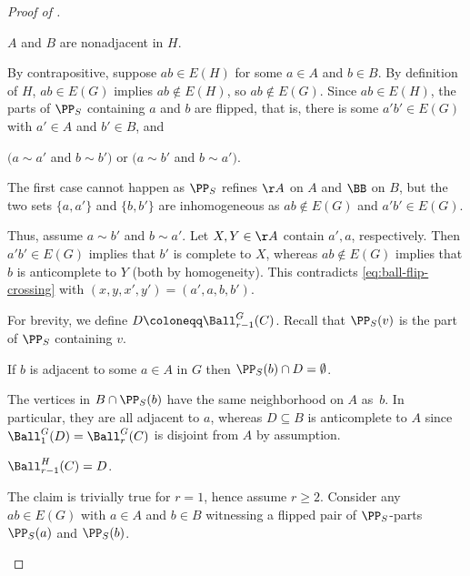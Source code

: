 \begin{proof}[Proof of ]
    \begin{claim}[\ref{itm:ball-flip-P1}]\label{clm:ball-flip-P1}
        $A$ and $B$ are nonadjacent in $H$.
    \end{claim}
    \begin{claimproof}
By contrapositive, suppose $ab\in E(H)$ for some $a \in A$ and $b \in B$.
    By definition of $H$,  $ab\in E(G)$ implies $ab\notin E(H)$, so
     $ab\notin E(G)$.
    Since $ab\in E(H)$, the parts of $\PP_S$ containing $a$ and $b$ are flipped, that is, there is some $a'b'\in E(G)$ with $a' \in A$ and $b' \in B$,
    and
    \begin{center}
        $(a\sim a'$ and $b\sim b')$
        \qquad
        or
        \qquad
        $(a\sim b'$ and $b\sim a')$.
    \end{center}
    The first case cannot happen
    as $\PP_S$ refines $\AA$ on $A$ and $\BB$ on $B$, but the two sets $\{a,a'\}$ and $\{b,b'\}$ are inhomogeneous as $ab\notin E(G)$ and $a'b'\in E(G)$.

    Thus, assume $a\sim b'$ and $b\sim a'$.
    Let $X,Y\in\AA$ contain $a',a$, respectively.
    Then $a'b'\in E(G)$ implies that $b'$ is complete to $X$, whereas  $ab\notin E(G)$ implies that $b$ is anticomplete to $Y$ (both by homogeneity). This contradicts \eqref{eq:ball-flip-crossing} with $(x,y,x',y')=(a',a,b,b')$.
\end{claimproof}

    For brevity, we define $D\coloneqq \Ball_{r-1}^G(C)$. Recall that $\PP_S(v)$ is the part of $\PP_S$ containing $v$.

    \begin{claim}\label{clm:disjoint-from-d}
        If $b$ is adjacent to some $a\in A$ in $G$ then
         $\PP_S(b)\cap D=\emptyset$.
    \end{claim}
    \begin{claimproof}
            The vertices in $B \cap \PP_S(b)$ have the same neighborhood on $A$ as~$b$. In particular, they are all adjacent to $a$, whereas $D \subseteq B$ is anticomplete to $A$ since $\Ball^G_1(D)=\Ball^G_r(C)$ is disjoint from $A$ by assumption.
    \end{claimproof}

    \begin{claim}[\ref{itm:ball-flip-P2}]\label{clm:ball-flip-P2}
        $\Ball_{r-1}^H(C)=D$.
    \end{claim}
    \begin{claimproof}
    The claim is trivially true for $r = 1$, hence assume $r\geq 2$.
    Consider any  $ab\in E(G)$ with $a \in A$ and $b \in B$ witnessing a flipped pair of $\PP_S$-parts $\PP_S(a)$ and $\PP_S(b)$.


\end{claimproof}
\end{proof}
